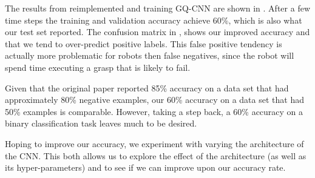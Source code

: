 The results from reimplemented and training GQ-CNN are shown in . 
After a few time steps the training and validation accuracy achieve 60\%, which is also what our test set reported. 
The confusion matrix in , shows our improved accuracy and that we tend to over-predict positive labels. 
This false positive tendency is actually more problematic for robots then false negatives, since the robot will spend time executing a grasp that is likely to fail. 

Given that the original paper reported 85\% accuracy on a data set that had approximately 80\% negative examples, our 60\% accuracy on a data set that had 50\% examples is comparable. 
However, taking a step back, a 60\% accuracy on a binary classification task leaves much to be desired. 

Hoping to improve our accuracy, we experiment with varying the architecture of the CNN. 
This both allows us to explore the effect of the architecture (as well as its hyper-parameters) and to see if we can improve upon our accuracy rate. 

